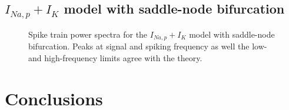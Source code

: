 \documentclass[12pt,a4paper]{article}
\begin{document}
\subsection{$I_{Na,p}+I_K$ model with saddle-node bifurcation}
\begin{figure}[H]
	\label{snspec}
	\hspace*{-0.5cm}
	\caption{Spike train power spectra for the $I_{Na,p}+I_K$ model with saddle-node bifurcation. Peaks at signal and spiking frequency as well the low- and high-frequency limits agree with the theory.}
\end{figure}
\section{Conclusions}



\end{document}
